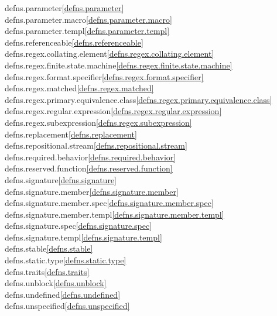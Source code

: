 \begin{multicols}{2}
defns.parameter\quad\ref{defns.parameter}\\
defns.parameter.macro\quad\ref{defns.parameter.macro}\\
defns.parameter.templ\quad\ref{defns.parameter.templ}\\
defns.referenceable\quad\ref{defns.referenceable}\\
defns.regex.collating.element\quad\ref{defns.regex.collating.element}\\
defns.regex.finite.state.machine\quad\ref{defns.regex.finite.state.machine}\\
defns.regex.format.specifier\quad\ref{defns.regex.format.specifier}\\
defns.regex.matched\quad\ref{defns.regex.matched}\\
defns.regex.primary.equivalence.class\quad\ref{defns.regex.primary.equivalence.class}\\
defns.regex.regular.expression\quad\ref{defns.regex.regular.expression}\\
defns.regex.subexpression\quad\ref{defns.regex.subexpression}\\
defns.replacement\quad\ref{defns.replacement}\\
defns.repositional.stream\quad\ref{defns.repositional.stream}\\
defns.required.behavior\quad\ref{defns.required.behavior}\\
defns.reserved.function\quad\ref{defns.reserved.function}\\
defns.signature\quad\ref{defns.signature}\\
defns.signature.member\quad\ref{defns.signature.member}\\
defns.signature.member.spec\quad\ref{defns.signature.member.spec}\\
defns.signature.member.templ\quad\ref{defns.signature.member.templ}\\
defns.signature.spec\quad\ref{defns.signature.spec}\\
defns.signature.templ\quad\ref{defns.signature.templ}\\
defns.stable\quad\ref{defns.stable}\\
defns.static.type\quad\ref{defns.static.type}\\
defns.traits\quad\ref{defns.traits}\\
defns.unblock\quad\ref{defns.unblock}\\
defns.undefined\quad\ref{defns.undefined}\\
defns.unspecified\quad\ref{defns.unspecified}\\

\end{multicols}

